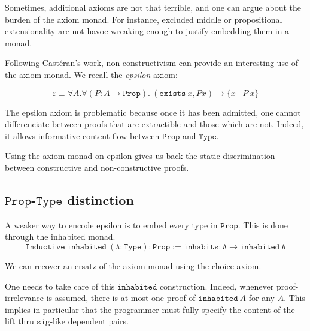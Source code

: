 \documentclass[a4paper,11pt]{article}
\theoremstyle{definition}
\theoremstyle{remark}
\begin{document}
Sometimes, additional axioms are not that terrible, and one can argue about the burden of the axiom monad. For instance, excluded middle or propositional extensionality are not havoc-wreaking enough to justify embedding them in a monad.

Following Castéran's work, non-constructivism can provide an interesting use of the axiom monad. We recall the \emph{epsilon} axiom:

$$\varepsilon \equiv \forall A.\forall (P : A\rightarrow  \mathtt{Prop}).\ (\mathtt{exists}\ x, P x) \rightarrow \{x\mid P\  x\}$$

The epsilon axiom is problematic because once it has been admitted, one cannot differenciate between proofs that are extractible and those which are not. Indeed, it allows informative content flow between $\mathtt{Prop}$ and $\mathtt{Type}$.

Using the axiom monad on epsilon gives us back the static discrimination between constructive and non-constructive proofs.

\subsection{$\mathtt{Prop}$-$\mathtt{Type}$ distinction}

A weaker way to encode epsilon is to embed every type in $\mathtt{Prop}$. This is done through the inhabited monad.
$$\mathtt{Inductive\ inhabited\ (A : Type) : Prop :=  inhabits : A \rightarrow inhabited\ A}$$

We can recover an ersatz of the axiom monad using the choice axiom.

One needs to take care of this $\mathtt{inhabited}$ construction. Indeed, whenever proof-irrelevance is assumed, there is at most one proof of $\mathtt{inhabited}\ A$ for any $A$. This implies in particular that the programmer must fully specify the content of the lift thru $\mathtt{sig}$-like dependent pairs.
\end{document}
